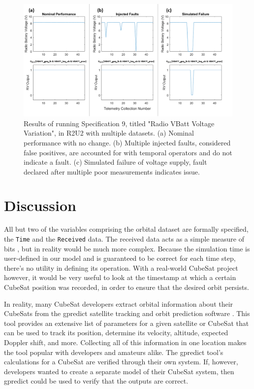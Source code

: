 \documentclass[conf]{new-aiaa}
\begin{document}
\begin{figure}[!hb]
\centering
\includegraphics[width=.8\textwidth]{Fig/VBATT_Spec9.png}
\caption{Results of running Specification 9, titled "Radio VBatt Voltage Variation", in R2U2 with multiple datasets. (a) Nominal performance with no change. (b) Multiple injected faults, considered false positives, are accounted for with temporal operators and do not indicate a fault. (c) Simulated failure of voltage supply, fault declared after multiple poor measurements indicates issue.}
\label{VBATTSpecResults}
\end{figure}

\section{Discussion}

All but two of the variables comprising the orbital dataset are formally specified, the \texttt{Time} and the \texttt{Received} data. The received data acts as a simple measure of bits%
, but in reality would be much more complex. Because the simulation time is user-defined in our model and is guaranteed to be correct for each time step, there's no utility in defining its operation. With a real-world CubeSat project however, it would be very useful to look at the timestamp at which a certain CubeSat position was recorded, in order to ensure that the desired orbit persists.

In reality, many CubeSat developers extract orbital information about their CubeSats from the gpredict satellite tracking and orbit prediction software \cite{csete2018}. This tool provides an extensive list of parameters for a given satellite or CubeSat that can be used to track its position, determine its velocity, altitude, expected Doppler shift, and more. Collecting all of this information in one location makes the tool popular with developers and amateurs alike. The gpredict tool's calculations for a CubeSat are verified through their own system. If, however, developers wanted to create a separate model of their CubeSat system, then gpredict could be used to verify that the outputs are correct.
\end{document}
